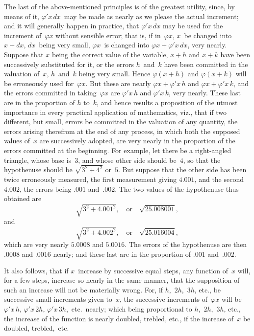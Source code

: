 \documentclass[12pt]{book}[2005/09/16]
\newcommand{\Pagelabel}[1]{\phantomsection\label{page:#1}}
\newcommand{\PageSep}[1]{\Pagelabel{#1}\ignorespaces}
\renewcommand{\(}{{\upshape(}}
\renewcommand{\)}{{\upshape)}}
\renewcommand{\phi}{\varphi}
\begin{document}
The last of the above-mentioned principles is of
the greatest utility, since, by means of it, $\phi' x\, dx$~may
\PageSep{75}
%
be made as nearly as we please the actual increment;
and it will generally happen in practice, that $\phi' x\, dx$
may be used for the increment of~$\phi x$ without sensible
error; that is, if in~$\phi x$, $x$~be changed into $x + dx$, $dx$~being
very small, $\phi x$~is changed into $\phi x + \phi' x\, dx$,
very nearly. Suppose that $x$ being the correct value
of the variable, $x + h$ and $x + k$ have been successively
substituted for it, or the errors $h$~and~$k$ have
been committed in the valuation of~$x$, $h$~and~$k$ being
very small. Hence $\phi(x + h)$ and $\phi(x + k)$ will be
erroneously used for~$\phi x$. But these are nearly $\phi x + \phi' x\, h$
and $\phi x + \phi' x\, k$, and the errors committed in
taking~$\phi x$ are $\phi' x\, h$ and $\phi' x\, k$, very nearly. These
last are in the proportion of $h$ to~$k$, and hence results
a proposition of the utmost importance in every practical
application of mathematics, viz., that if two different,
but small, errors be committed in the valuation
of any quantity, the errors arising therefrom at
the end of any process, in which both the supposed
values of~$x$ are successively adopted, are very nearly
in the proportion of the errors committed at the beginning.
For example, let there be a right-angled
triangle, whose base is~$3$, and whose other side should
be~$4$, so that the hypothenuse should be $\sqrt{3^{2} + 4^{2}}$
or~$5$. But suppose that the other side has been twice
erroneously measured, the first measurement giving
$4.001$, and the second $4.002$, the errors being $.001$
and~$.002$. The two values of the hypothenuse thus
obtained are
\[
\sqrt{3^{2} + 4.001^{2}}, \quad\text{or}\quad \sqrt{25.008001},
\]
and
\[
\sqrt{3^{2} + 4.002^{2}}, \quad\text{or}\quad \sqrt{25.016004},
\]
which are very nearly $5.0008$ and $5.0016$. The errors
of the hypothenuse are then $.0008$ and $.0016$ nearly;
and these last are in the proportion of $.001$ and~$.002$.
\PageSep{76}

It also follows, that if $x$~increase by successive equal
steps, any function of~$x$ will, for a few steps, increase
so nearly in the same manner, that the supposition of
such an increase will not be materially wrong. For,
if $h$,~$2h$,~$3h$, etc., be successive small increments given
to~$x$, the successive increments of~$\phi x$ will be $\phi' x\, h$,
$\phi' x\, 2h$, $\phi' x\, 3h$,~etc.\ nearly; which being proportional
to $h$,~$2h$,~$3h$, etc., the increase of the function is nearly
doubled, trebled, etc., if the increase of~$x$ be doubled,
trebled,~etc.
\end{document}
